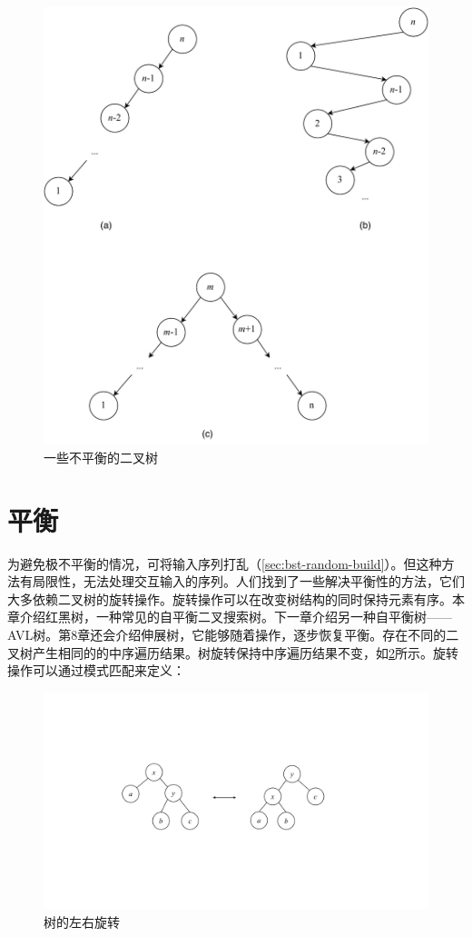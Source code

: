 \documentclass[b5paper]{ctexart}
\begin{document}
\begin{figure}[htbp]
  \centering
  \includegraphics[scale=0.5]{img/unbalanced-trees}
  \caption{一些不平衡的二叉树}
  \label{fig:unbalanced-trees}
\end{figure}

\section{平衡}

为避免极不平衡的情况，可将输入序列打乱（\cref{sec:bst-random-build}）。但这种方法有局限性，无法处理交互输入的序列。人们找到了一些解决平衡性的方法，它们大多依赖二叉树的旋转操作。旋转操作可以在改变树结构的同时保持元素有序。本章介绍红黑树，一种常见的自平衡二叉搜索树。下一章介绍另一种自平衡树——AVL树。第8章还会介绍伸展树，它能够随着操作，逐步恢复平衡。存在不同的二叉树产生相同的的中序遍历结果。树旋转保持中序遍历结果不变，如\cref{fig:tree-rotation}所示。旋转操作可以通过模式匹配来定义：

\begin{figure}[htbp]
  \centering
  \includegraphics[scale=0.4, page=1]{img/rbtree}
  \caption{树的左右旋转}
  \label{fig:tree-rotation}
\end{figure}
\end{document}
